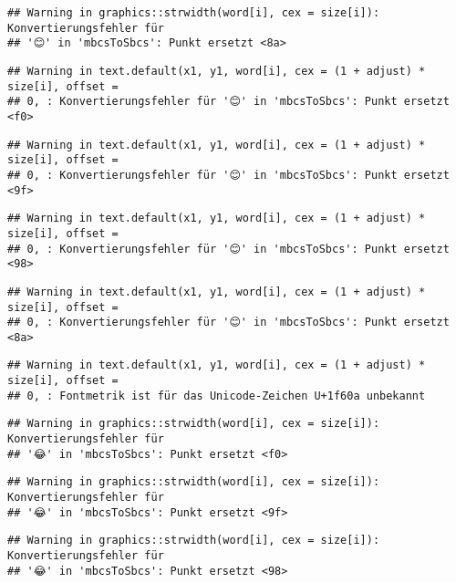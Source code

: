 \documentclass[
]{book}
\begin{document}
\begin{verbatim}
## Warning in graphics::strwidth(word[i], cex = size[i]): Konvertierungsfehler für
## '😊' in 'mbcsToSbcs': Punkt ersetzt <8a>
\end{verbatim}

\begin{verbatim}
## Warning in text.default(x1, y1, word[i], cex = (1 + adjust) * size[i], offset =
## 0, : Konvertierungsfehler für '😊' in 'mbcsToSbcs': Punkt ersetzt <f0>
\end{verbatim}

\begin{verbatim}
## Warning in text.default(x1, y1, word[i], cex = (1 + adjust) * size[i], offset =
## 0, : Konvertierungsfehler für '😊' in 'mbcsToSbcs': Punkt ersetzt <9f>
\end{verbatim}

\begin{verbatim}
## Warning in text.default(x1, y1, word[i], cex = (1 + adjust) * size[i], offset =
## 0, : Konvertierungsfehler für '😊' in 'mbcsToSbcs': Punkt ersetzt <98>
\end{verbatim}

\begin{verbatim}
## Warning in text.default(x1, y1, word[i], cex = (1 + adjust) * size[i], offset =
## 0, : Konvertierungsfehler für '😊' in 'mbcsToSbcs': Punkt ersetzt <8a>
\end{verbatim}

\begin{verbatim}
## Warning in text.default(x1, y1, word[i], cex = (1 + adjust) * size[i], offset =
## 0, : Fontmetrik ist für das Unicode-Zeichen U+1f60a unbekannt
\end{verbatim}

\begin{verbatim}
## Warning in graphics::strwidth(word[i], cex = size[i]): Konvertierungsfehler für
## '😂' in 'mbcsToSbcs': Punkt ersetzt <f0>
\end{verbatim}

\begin{verbatim}
## Warning in graphics::strwidth(word[i], cex = size[i]): Konvertierungsfehler für
## '😂' in 'mbcsToSbcs': Punkt ersetzt <9f>
\end{verbatim}

\begin{verbatim}
## Warning in graphics::strwidth(word[i], cex = size[i]): Konvertierungsfehler für
## '😂' in 'mbcsToSbcs': Punkt ersetzt <98>
\end{verbatim}
\end{document}
